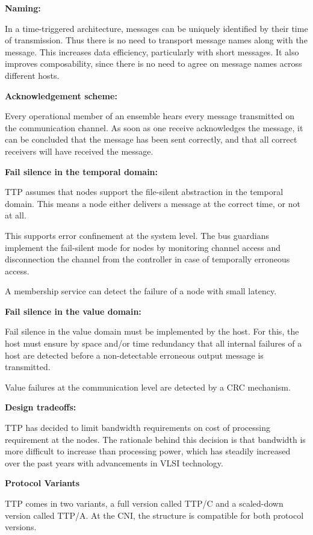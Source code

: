 \textbf{Naming:}

In a time-triggered architecture, messages can be uniquely identified by
their time of transmission. Thus there is no need to transport message
names along with the message. This increases data efficiency,
particularly with short messages. It also improves composability, since
there is no need to agree on message names across different hosts.

\textbf{Acknowledgement scheme:}

Every operational member of an ensemble hears every message transmitted
on the communication channel. As soon as one receive acknowledges the
message, it can be concluded that the message has been sent correctly,
and that all correct receivers will have received the mes­sage.

\textbf{Fail silence in the temporal domain:}

TTP assumes that nodes support the file-silent abstraction in the
temporal domain. This means a node either delivers a message at the
correct time, or not at all.

This supports error confinement at the system level. The bus guardians
implement the fail-silent mode for nodes by monitoring channel access
and disconnection the channel from the controller in case of temporally
erroneous access.

A membership service can detect the failure of a node with small
latency.

\textbf{Fail silence in the value domain:}

Fail silence in the value domain must be implemented by the host. For
this, the host must ensure by space and/or time redundancy that all
internal failures of a host are detected before a non-detectable
erroneous output message is transmitted.

Value failures at the communication level are detected by a CRC
mechanism.

\textbf{Design tradeoffs:}

TTP has decided to limit bandwidth requirements on cost of processing
requirement at the nodes. The rationale behind this decision is that
bandwidth is more difficult to increase than processing power, which has
steadily increased over the past years with advancements in VLSI
technology.

\textbf{Protocol Variants}

TTP comes in two variants, a full version called TTP/C and a scaled-down
version called TTP/A. At the CNI, the structure is compatible for both
protocol versions.

